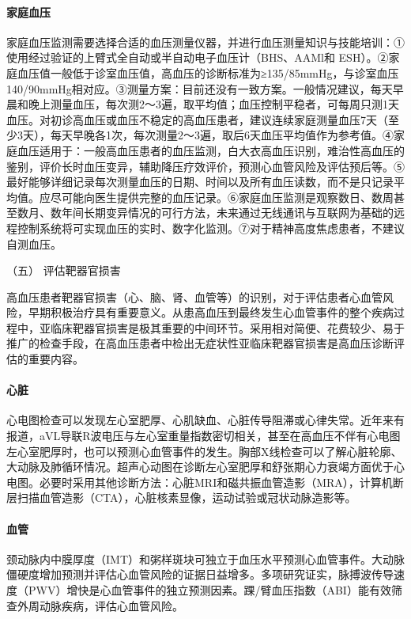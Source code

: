 \paragraph{家庭血压}

家庭血压监测需要选择合适的血压测量仪器，并进行血压测量知识与技能培训：①使用经过验证的上臂式全自动或半自动电子血压计（BHS、AAMl和
ESH）。②家庭血压值一般低于诊室血压值，高血压的诊断标准为≥135/85mmHg，与诊室血压140/90mmHg相对应。③测量方案：目前还没有一致方案。一般情况建议，每天早晨和晚上测量血压，每次测2～3遍，取平均值；血压控制平稳者，可每周只测1天血压。对初诊高血压或血压不稳定的高血压患者，建议连续家庭测量血压7天（至少3天），每天早晚各1次，每次测量2～3遍，取后6天血压平均值作为参考值。④家庭血压适用于：一般高血压患者的血压监测，白大衣高血压识别，难治性高血压的鉴别，评价长时血压变异，辅助降压疗效评价，预测心血管风险及评估预后等。⑤最好能够详细记录每次测量血压的日期、时间以及所有血压读数，而不是只记录平均值。应尽可能向医生提供完整的血压记录。⑥家庭血压监测是观察数日、数周甚至数月、数年间长期变异情况的可行方法，未来通过无线通讯与互联网为基础的远程控制系统将可实现血压的实时、数字化监测。⑦对于精神高度焦虑患者，不建议自测血压。

\hypertarget{text00409.htmlux5cux23CHP17-3-1-3-5}{}
（五） 评估靶器官损害

高血压患者靶器官损害（心、脑、肾、血管等）的识别，对于评估患者心血管风险，早期积极治疗具有重要意义。从患高血压到最终发生心血管事件的整个疾病过程中，亚临床靶器官损害是极其重要的中间环节。采用相对简便、花费较少、易于推广的检查手段，在高血压患者中检出无症状性亚临床靶器官损害是高血压诊断评估的重要内容。

\paragraph{心脏}

心电图检查可以发现左心室肥厚、心肌缺血、心脏传导阻滞或心律失常。近年来有报道，aVL导联R波电压与左心室重量指数密切相关，甚至在高血压不伴有心电图左心室肥厚时，也可以预测心血管事件的发生。胸部X线检查可以了解心脏轮廓、大动脉及肺循环情况。超声心动图在诊断左心室肥厚和舒张期心力衰竭方面优于心电图。必要时采用其他诊断方法：心脏MRI和磁共振血管造影（MRA），计算机断层扫描血管造影（CTA），心脏核素显像，运动试验或冠状动脉造影等。

\paragraph{血管}

颈动脉内中膜厚度（IMT）和粥样斑块可独立于血压水平预测心血管事件。大动脉僵硬度增加预测并评估心血管风险的证据日益增多。多项研究证实，脉搏波传导速度（PWV）增快是心血管事件的独立预测因素。踝/臂血压指数（ABI）能有效筛查外周动脉疾病，评估心血管风险。

